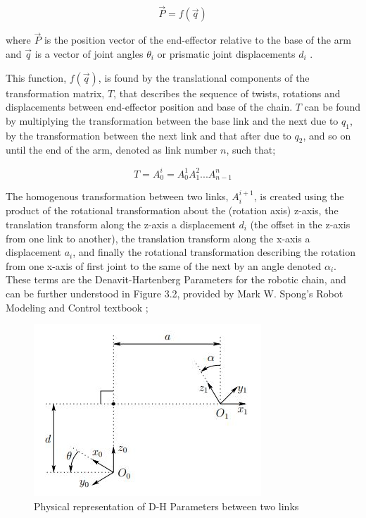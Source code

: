 \documentclass[12pt,openany,a4paper]{book}
\begin{document}
\vspace{\baselineskip}
\begin{equation}
\vec{P} = f( \vec{q} )
\end{equation}

\vspace{\baselineskip}
where $\vec{P}$ is the position vector of the end-effector relative to the base of the arm and $\vec{q}$ is a vector of joint angles $\theta_i$ or prismatic joint displacements $d_i$ \cite{Spong}.

This function, $f(\vec{q})$, is found by the translational components of the transformation matrix, $T$, that describes the sequence of twists, rotations and displacements between end-effector position and base of the chain. $T$ can be found by multiplying the transformation between the base link and the next due to $q_1$, by the transformation between the next link and that after due to $q_2$, and so on until the end of the arm, denoted as link number $n$, such that;

\vspace{\baselineskip}
\begin{equation}
T = A_{0}^i = A_{0}^{1} A_{1}^{2} ... A_{n-1}^n
\end{equation}

\vspace{\baselineskip}
The homogenous transformation between two links, $A_{i}^{i+1}$, is created using the product of the rotational transformation about the (rotation axis) z-axis, the translation transform along the z-axis a displacement $d_i$ (the offset in the z-axis from one link to another), the translation transform along the x-axis a displacement $a_i$, and finally the rotational transformation describing the rotation from one x-axis of first joint to the same of the next by an angle denoted $\alpha_i$. These terms are the Denavit-Hartenberg Parameters for the robotic chain, and can be further understood in Figure 3.2, provided by Mark W. Spong's Robot Modeling and Control textbook \cite{Spong};

\begin{center}
\begin{figure}[htb]
  \includegraphics[width=0.6\linewidth]{DH_Parameters_figure.jpg}
\caption{Physical representation of D-H Parameters between two links}
\end{figure}
\end{center}
\end{document}
